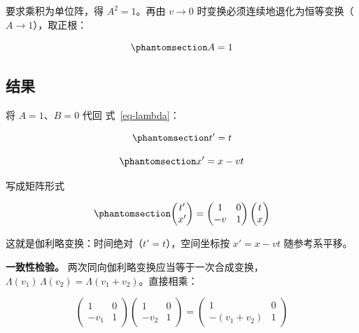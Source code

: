 \documentclass[
  chinese,
  a4paper,
  UTF8,
  12pt,
  oneside,
  openany]{ctexbook}
\theoremstyle{plain}
\theoremstyle{plain}
\theoremstyle{plain}
\theoremstyle{definition}
\theoremstyle{plain}
\theoremstyle{plain}
\theoremstyle{remark}
\begin{document}
要求乘积为单位阵，得 \(A^{2} = 1\)。再由 \(v \to 0\)
时变换必须连续地退化为恒等变换（\(A \to 1\)），取正根：

\begin{equation}\protect\phantomsection\label{eq-galilean-a}{
A = 1
}\end{equation}

\subsection{结果}\label{ux7ed3ux679c}

将 \(A = 1\)、\(B = 0\) 代回 式~\ref{eq-lambda}：

\begin{equation}\protect\phantomsection\label{eq-galilean-t}{
t' = t
}\end{equation}

\begin{equation}\protect\phantomsection\label{eq-galilean-x}{
x' = x - vt
}\end{equation}

写成矩阵形式

\begin{equation}\protect\phantomsection\label{eq-galilean-mat}{
\begin{pmatrix} t' \\ x' \end{pmatrix}
=
\begin{pmatrix} 1 & 0 \\ -v & 1 \end{pmatrix}
\begin{pmatrix} t \\ x \end{pmatrix}
}\end{equation}

这就是伽利略变换：时间绝对（\(t' = t\)），空间坐标按 \(x' = x - vt\)
随参考系平移。

\textbf{一致性检验。}
两次同向伽利略变换应当等于一次合成变换，\(\Lambda(v_{1})\,\Lambda(v_{2}) = \Lambda(v_{1} + v_{2})\)。直接相乘：

\[
\begin{pmatrix} 1 & 0 \\ -v_{1} & 1 \end{pmatrix}
\begin{pmatrix} 1 & 0 \\ -v_{2} & 1 \end{pmatrix}
=
\begin{pmatrix} 1 & 0 \\ -(v_{1} + v_{2}) & 1 \end{pmatrix}
\]
\end{document}
